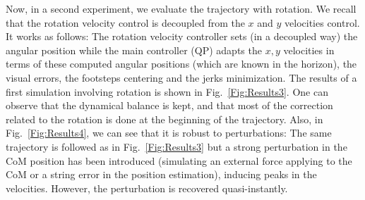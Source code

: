 Now, in a second experiment, we evaluate the trajectory with rotation. We recall that the rotation velocity control is decoupled from the $x$ and $y$ velocities control. It works as follows: The rotation velocity controller sets (in a decoupled way) the angular position while the main controller (QP) adapts the $x,y$ velocities in terms of these computed angular positions (which are known in the horizon), the visual errors, the footsteps centering and the jerks minimization. The results of a first simulation involving rotation is shown in Fig.~\ref{Fig:Results3}. One can observe that the dynamical balance is kept, and that most of the correction related to the rotation is done at the beginning of the trajectory. Also, in Fig.~\ref{Fig:Results4}, we can see that it is robust to perturbations: The same trajectory is followed as in Fig.~\ref{Fig:Results3} but a strong perturbation in the CoM position has been introduced (simulating an external force applying to the CoM or a string error in the position estimation), inducing peaks in the velocities. However, the perturbation is recovered quasi-instantly.

